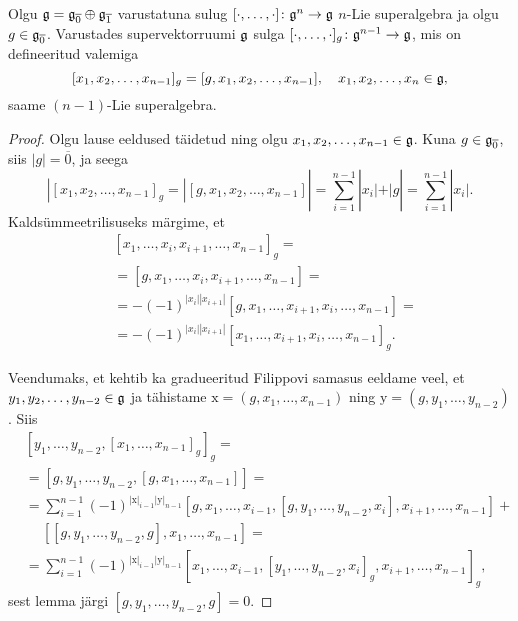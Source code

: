 \begin{lau}
    Olgu $\mathfrak{g} = \mathfrak{g}_{\overline{0}} \oplus \mathfrak{g}_{\overline{1}}$ varustatuna
    sulug $[\cdot, \dots, \cdot] \colon \mathfrak{g}^n \to \mathfrak{g}$ $n$-Lie
    superalgebra ja olgu $g \in \mathfrak{g}_{\overline{0}}$. Varustades
    supervektorruumi $\mathfrak{g}$ sulga
    $[\cdot, \dots, \cdot]_g \colon \mathfrak{g}^{n-1} \to \mathfrak{g}$, mis on
    defineeritud valemiga
    \[
        [x_1, x_2, \dots, x_{n-1}]_g = [g, x_1, x_2, \dots, x_{n-1}],
        \quad x_1, x_2, \dots, x_n \in \mathfrak{g},
    \]
    saame $(n-1)$-Lie superalgebra.
\end{lau}

\begin{proof}
    Olgu lause eeldused täidetud ning olgu
    $x_1, x_2, \dots, x_{n-1} \in \mathfrak{g}$. Kuna
    $g \in \mathfrak{g}_{\overline{0}}$, siis $|g| = \overline{0}$, ja seega
    \[
        |[x_1, x_2, \dots, x_{n-1}]_g =
        |[g, x_1, x_2, \dots, x_{n-1}]| =
        \sum_{i=1}^{n-1} |x_i| + |g| =
        \sum_{i=1}^{n-1} |x_i|.
    \]
    Kaldsümmeetrilisuseks märgime, et
    \begin{align*}
        &[x_1, \dots, x_i, x_{i+1}, \dots, x_{n-1}]_g = \\
        &=[g, x_1, \dots, x_i, x_{i+1}, \dots, x_{n-1}] = \\
        &=-(-1)^{|x_i||x_{i+1}|}
            [g, x_1, \dots, x_{i+1}, x_i, \dots, x_{n-1}] = \\
        &=-(-1)^{|x_i||x_{i+1}|}
            [x_1, \dots, x_{i+1}, x_i, \dots, x_{n-1}]_g.
    \end{align*}

    Veendumaks, et kehtib ka gradueeritud Filippovi samasus
    eeldame veel, et $y_1, y_2, \dots, y_{n-2} \in \mathfrak{g}$ ja tähistame
    $\mathrm{x} = (g, x_1, \dots, x_{n-1})$ ning
    $\mathrm{y} = (g, y_1, \dots, y_{n-2})$. Siis
    \begin{align*}
        & [y_1, \dots, y_{n-2}, [x_1, \dots, x_{n-1}]_g]_g = \\
        &= [g, y_1, \dots, y_{n-2}, [g, x_1, \dots, x_{n-1}]] = \\
        &= \sum_{i=1}^{n-1} (-1)^{
            |\mathrm{x}|_{i-1} |\mathrm{y}|_{n-1}
        } [g, x_1, \dots, x_{i-1}, [g, y_1, \dots, y_{n-2}, x_i],
            x_{i+1}, \dots, x_{n-1}] + \\
        &\quad\ [[g, y_1, \dots, y_{n-2}, g], x_1, \dots, x_{n-1}] = \\
        &= \sum_{i=1}^{n-1} (-1)^{
            |\mathrm{x}|_{i-1} |\mathrm{y}|_{n-1}
        } [x_1, \dots, x_{i-1}, [y_1, \dots, y_{n-2}, x_i]_g,
            x_{i+1}, \dots, x_{n-1}]_g,
    \end{align*}
    sest lemma järgi $[g, y_1, \dots, y_{n-2}, g] = 0$.
\end{proof}

